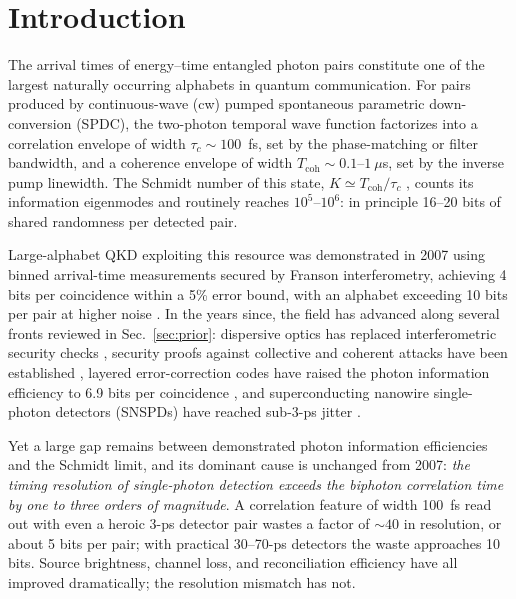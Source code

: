 \documentclass[11pt]{article}
\begin{document}
\section{Introduction}
\label{sec:intro}

The arrival times of energy--time entangled photon pairs constitute one of the largest naturally occurring alphabets in quantum communication. For pairs produced by continuous-wave (cw) pumped spontaneous parametric down-conversion (SPDC), the two-photon temporal wave function factorizes into a correlation envelope of width $\tau_c \sim 100$~fs, set by the phase-matching or filter bandwidth, and a coherence envelope of width $T_{\mathrm{coh}} \sim 0.1$--$1~\mu$s, set by the inverse pump linewidth. The Schmidt number of this state, $K \simeq T_{\mathrm{coh}}/\tau_c$ \cite{LawEberly2004,AliKhanHowell2006}, counts its information eigenmodes and routinely reaches $10^5$--$10^6$: in principle 16--20 bits of shared randomness per detected pair.

Large-alphabet QKD exploiting this resource was demonstrated in 2007 using binned arrival-time measurements secured by Franson interferometry, achieving 4 bits per coincidence within a 5\% error bound, with an alphabet exceeding 10 bits per pair at higher noise \cite{AliKhan2007}. In the years since, the field has advanced along several fronts reviewed in Sec.~\ref{sec:prior}: dispersive optics has replaced interferometric security checks \cite{Mower2013,Lee2014}, security proofs against collective and coherent attacks have been established \cite{Zhang2014,Niu2016}, layered error-correction codes have raised the photon information efficiency to 6.9 bits per coincidence \cite{Zhong2015}, and superconducting nanowire single-photon detectors (SNSPDs) have reached sub-3-ps jitter \cite{Korzh2020}.

Yet a large gap remains between demonstrated photon information efficiencies and the Schmidt limit, and its dominant cause is unchanged from 2007: \emph{the timing resolution of single-photon detection exceeds the biphoton correlation time by one to three orders of magnitude}. A correlation feature of width 100~fs read out with even a heroic 3-ps detector pair wastes a factor of $\sim 40$ in resolution, or about 5 bits per pair; with practical 30--70-ps detectors the waste approaches 10 bits. Source brightness, channel loss, and reconciliation efficiency have all improved dramatically; the resolution mismatch has not.
\end{document}
